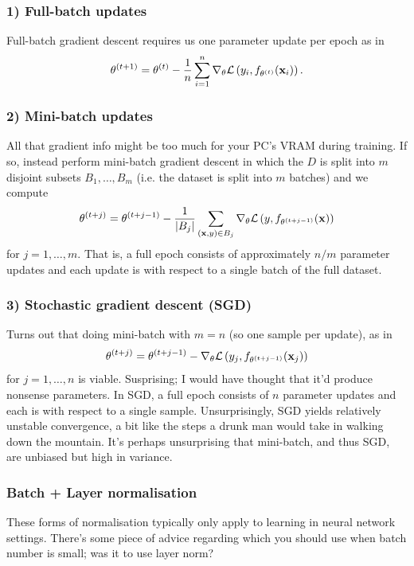 \documentclass[11pt]{article}
\begin{document}
\subsubsection*{1) Full-batch updates}
Full-batch gradient descent requires us one parameter update per epoch as in
$$
\theta^{(t+1)}
=
\theta^{(t)}-\frac{1}{n}\sum_{i=1}^n \nabla_{\theta}\mathcal{L}\left(y_i,f_{\theta^{(t)}}(\mathbf{x}_i)\right).
$$

\subsubsection*{2) Mini-batch updates}
All that gradient info might be too much for your PC's VRAM during training. If so, instead perform mini-batch gradient descent in which the $D$ is split into $m$ disjoint subsets $B_1,\dots,B_m$ (i.e. the dataset is split into $m$ batches) and we compute
$$
\theta^{(t+j)}
=
\theta^{(t+j-1)}-\frac{1}{|B_j|}\sum_{(\mathbf{x},y)\in B_j} \nabla_{\theta}\mathcal{L}\left(y,f_{\theta^{(t+j-1)}}(\mathbf{x})\right)
$$
for $j=1,\dots,m$. That is, a full epoch consists of approximately $n/m$ parameter updates and each update is with respect to a single batch of the full dataset.

\subsubsection*{3) Stochastic gradient descent (SGD)}
Turns out that doing mini-batch with $m=n$ (so one sample per update), as in
$$
\theta^{(t+j)}
=
\theta^{(t+j-1)}-\nabla_{\theta}\mathcal{L}\left(y_j,f_{\theta^{(t+j-1)}}(\mathbf{x}_j)\right)
$$
for $j=1,\dots,n$ is viable. Susprising; I would have thought that it'd produce nonsense parameters. In SGD, a full epoch consists of $n$ parameter updates and each is with respect to a single sample. Unsurprisingly, SGD yields relatively unstable convergence, a bit like the steps a drunk man would take in walking down the mountain. It's perhaps unsurprising that mini-batch, and thus SGD, are unbiased but high in variance.

\subsubsection{Batch + Layer normalisation}
These forms of normalisation typically only apply to learning in neural network settings. There's some piece of advice regarding which you should use when batch number is small; was it to use layer norm?
\end{document}
